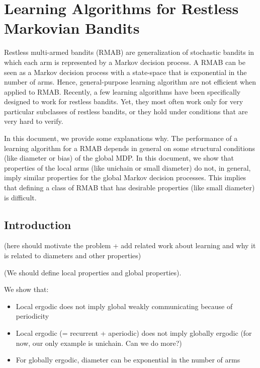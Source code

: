 \begingroup
\chapter{Learning Algorithms for Restless Markovian Bandits}
\label{ch:learn_restless}


\let\clearpage\relax

Restless multi-armed bandits (RMAB) are generalization of stochastic bandits in which each arm is represented by a Markov decision process. A RMAB can be seen as a Markov decision process with a state-space that is exponential in the number of arms. Hence, general-purpose learning algorithm are not efficient when applied to RMAB. Recently, a few learning algorithms have been specifically designed to work for restless bandits. Yet, they most often work only for very particular subclasses of restless bandits, or they hold under conditions that are very hard to verify.
    
In this document, we provide some explanations why. The performance of a learning algorithm for a RMAB depends in general on some structural conditions (like diameter or bias) of the global MDP.  In this document, we show that properties of the local arms (like unichain or small diameter) do not, in general, imply similar properties for the global Markov decision processes.  This implies that defining a class of RMAB that has desirable properties (like small diameter) is difficult. 

\section{Introduction}

(here should motivate the problem + add related work about learning and why it is related to diameters and other properties)

(We should define local properties and global properties).

We show that:
\begin{itemize}
    \item Local ergodic does not imply global weakly communicating because of periodicity 
    \item Local ergodic (= recurrent + aperiodic) does not imply globally ergodic (for now, our only example is unichain. Can we do more?)
    \item For globally ergodic, diameter can be exponential in the number of arms
\end{itemize}

